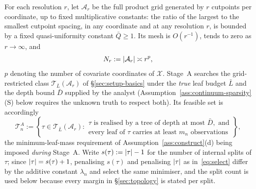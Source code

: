 \documentclass[11pt]{article}
\theoremstyle{plain}
\theoremstyle{definition}
\theoremstyle{remark}
\newcommand{\cX}{\mathcal{X}}
\newcommand{\cA}{\mathcal{A}}
\newcommand{\cT}{\mathcal{T}}
\DeclarePairedDelimiter{\card}{\lvert}{\rvert}
\begin{document}
For each resolution $r$, let $\cA_r$ be the full product grid generated by $r$
cutpoints per coordinate, up to fixed multiplicative constants: the ratio of
the largest to the smallest cutpoint spacing, in any coordinate and at any
resolution $r$, is bounded by a fixed quasi-uniformity constant $\bar Q\ge1$.
Its mesh is $O(r^{-1})$, tends to zero as $r\to\infty$, and
\[
  N_r:=\card{\cA_r}\asymp r^p ,
\]
$p$ denoting the number of covariate coordinates of $\cX$. Stage~A searches
the grid-restricted class $\cT_{\bar L}(\cA_r)$ of \S\ref{sec:setup-basics}
under the \emph{true} leaf budget $\bar L$ and the depth bound $\bar D$
supplied by the analyst (Assumption~\ref{ass:continuum-sparsity}(S) below
requires the unknown truth to respect both). Its feasible set is accordingly
\begin{equation}\label{eq:stage-a-feasible}
  \cT^A_n:=\left\{\tau\in\cT_{\bar L}(\cA_{r}):
  \begin{array}{l}
    \tau\text{ is realised by a tree of depth at most }\bar D,\text{ and}\\
    \text{every leaf of }\tau\text{ carries at least }m_n
    \text{ observations}
  \end{array}
  \right\},
\end{equation}
the minimum-leaf-mass requirement of Assumption~\ref{ass:construct}(d) being
imposed \emph{during} Stage~A. Write $s(\tau):=\card\tau-1$ for the number of
internal splits of $\tau$; since $\card\tau=s(\tau)+1$, penalising $s(\tau)$
and penalising $\card\tau$ as in~\eqref{eq:select} differ by the additive
constant $\lambda_n$ and select the same minimiser, and the split count is
used below because every margin in \S\ref{sec:topology} is stated per split.
\end{document}
